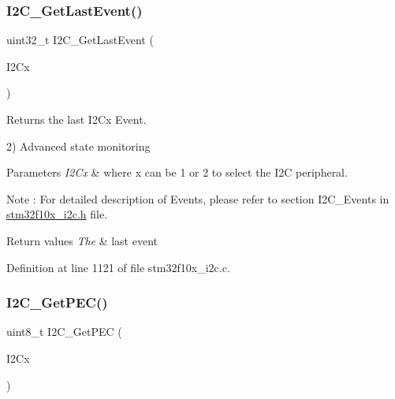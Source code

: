 \mbox{\label{group___i2_c___private___functions_ga29237aea9b5a3ead33167e1d027e9f1a}} 
\subsubsection{\texorpdfstring{I2\+C\+\_\+\+Get\+Last\+Event()}{I2C\_GetLastEvent()}}
{\footnotesize\ttfamily uint32\+\_\+t I2\+C\+\_\+\+Get\+Last\+Event (\begin{DoxyParamCaption}\item[{\hyperlink{struct_i2_c___type_def}{I2\+C\+\_\+\+Type\+Def} $\ast$}]{I2\+Cx }\end{DoxyParamCaption})}



Returns the last I2\+Cx Event. 

2) Advanced state monitoring 
\begin{DoxyParams}{Parameters}
{\em I2\+Cx} & where x can be 1 or 2 to select the I2C peripheral.\\
\hline
\end{DoxyParams}
\begin{DoxyNote}{Note}
\+: For detailed description of Events, please refer to section I2\+C\+\_\+\+Events in \hyperlink{stm32f10x__i2c_8h}{stm32f10x\+\_\+i2c.\+h} file.
\end{DoxyNote}

\begin{DoxyRetVals}{Return values}
{\em The} & last event \\
\hline
\end{DoxyRetVals}


Definition at line 1121 of file stm32f10x\+\_\+i2c.\+c.

\mbox{\label{group___i2_c___private___functions_ga7bf75e7c27c0e1d73e70fc0e1c7cd1dd}} 
\subsubsection{\texorpdfstring{I2\+C\+\_\+\+Get\+P\+E\+C()}{I2C\_GetPEC()}}
{\footnotesize\ttfamily uint8\+\_\+t I2\+C\+\_\+\+Get\+P\+EC (\begin{DoxyParamCaption}\item[{\hyperlink{struct_i2_c___type_def}{I2\+C\+\_\+\+Type\+Def} $\ast$}]{I2\+Cx }\end{DoxyParamCaption})}




